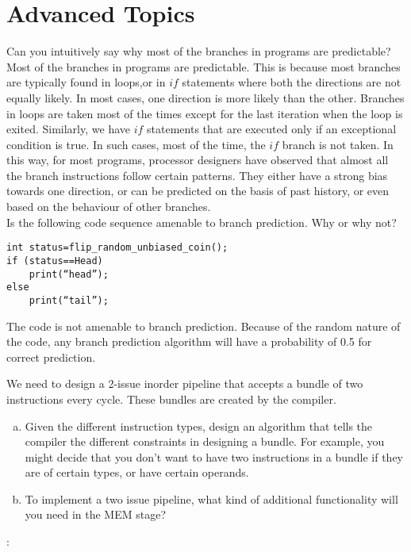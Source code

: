 \section*{Advanced Topics}

\begin{ExerciseList}
\Exercise
Can you intuitively say why most of the branches in programs are predictable?
\Answer
Most of the branches in programs are predictable. This is because most branches are typically found in loops,or in $if$ statements where both the directions are not equally likely. In most cases, one direction is more likely than the other. Branches in loops are taken most of the times except for the last iteration when the loop is exited. Similarly, we have $if$ statements that are executed only if an exceptional condition is true. In such cases, most of the time, the $if$ branch is not taken. In this way, for most programs, processor designers have observed that almost all the branch instructions follow certain patterns. They either have a strong bias towards one direction, or can be predicted on the basis of past history, or even based on the behaviour of other branches. \\ 
\Exercise
Is the following code sequence amenable to branch prediction. Why or why not?
\begin{Verbatim}[frame=single]
int status=flip_random_unbiased_coin();
if (status==Head)
	print(“head”);
else
	print(“tail”);
\end{Verbatim}
\Answer
The code is not amenable to branch prediction.
Because of the random nature of the code, any branch prediction algorithm will have
a probability of 0.5 for correct prediction. 


\Exercise
We need to design a 2-issue inorder pipeline that accepts a bundle of two instructions
every cycle. These bundles are created by the compiler.
\begin{enumerate}[(a) ]
\item
Given the different instruction types, design an algorithm that tells
the compiler the different constraints in designing a bundle. For example, you might
decide that you don't want to have two instructions in a bundle if they 
are of certain types, or have certain operands.

\item To implement a two issue pipeline, what kind of additional functionality will you need in the MEM stage?
\end{enumerate}

\Answer:


\end{ExerciseList}
